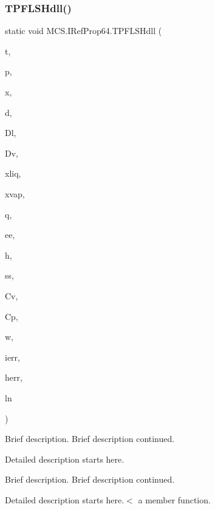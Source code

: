 \subsubsection{\texorpdfstring{T\+P\+F\+L\+S\+Hdll()}{TPFLSHdll()}}
{\footnotesize\ttfamily static void M\+C\+S.\+I\+Ref\+Prop64.\+T\+P\+F\+L\+S\+Hdll (\begin{DoxyParamCaption}\item[{ref double}]{t,  }\item[{ref double}]{p,  }\item[{\mbox{[}\+Marshal\+As(\+Unmanaged\+Type.\+L\+P\+Array, Size\+Param\+Index=0)\mbox{]} double \mbox{[}$\,$\mbox{]}}]{x,  }\item[{ref double}]{d,  }\item[{ref double}]{Dl,  }\item[{ref double}]{Dv,  }\item[{\mbox{[}\+Marshal\+As(\+Unmanaged\+Type.\+L\+P\+Array, Size\+Param\+Index=0)\mbox{]} double \mbox{[}$\,$\mbox{]}}]{xliq,  }\item[{\mbox{[}\+Marshal\+As(\+Unmanaged\+Type.\+L\+P\+Array, Size\+Param\+Index=0)\mbox{]} double \mbox{[}$\,$\mbox{]}}]{xvap,  }\item[{ref double}]{q,  }\item[{ref double}]{ee,  }\item[{ref double}]{h,  }\item[{ref double}]{ss,  }\item[{ref double}]{Cv,  }\item[{ref double}]{Cp,  }\item[{ref double}]{w,  }\item[{ref long}]{ierr,  }\item[{\mbox{[}\+Marshal\+As(\+Unmanaged\+Type.\+V\+B\+By\+Ref\+Str)\mbox{]} ref string}]{herr,  }\item[{ref long}]{ln }\end{DoxyParamCaption})}



Brief description. Brief description continued. 

Detailed description starts here.

Brief description. Brief description continued.

Detailed description starts here.$<$ a member function. \hypertarget{class_m_c_s_1_1_i_ref_prop64_a443a319f052304a628770d0f80bfe3b0}{}\label{class_m_c_s_1_1_i_ref_prop64_a443a319f052304a628770d0f80bfe3b0} 
